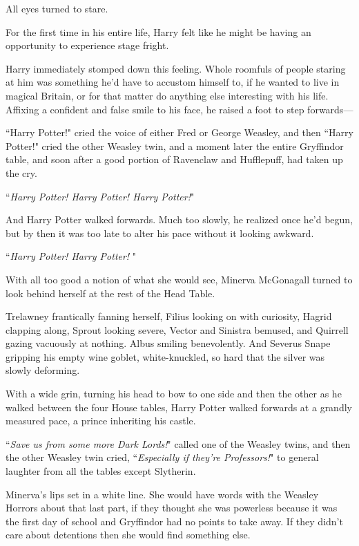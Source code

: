 All eyes turned to stare.

For the first time in his entire life, Harry felt like he might be having an opportunity to experience stage fright.

Harry immediately stomped down this feeling. Whole roomfuls of people staring at him was something he'd have to accustom himself to, if he wanted to live in magical Britain, or for that matter do anything else interesting with his life. Affixing a confident and false smile to his face, he raised a foot to step forwards—

``Harry Potter!" cried the voice of either Fred or George Weasley, and then ``Harry Potter!" cried the other Weasley twin, and a moment later the entire Gryffindor table, and soon after a good portion of Ravenclaw and Hufflepuff, had taken up the cry.

``\emph{Harry Potter! Harry Potter! Harry Potter!}"

And Harry Potter walked forwards. Much too slowly, he realized once he'd begun, but by then it was too late to alter his pace without it looking awkward.

\later

``\emph{Harry Potter! Harry Potter! }"

With all too good a notion of what she would see, Minerva McGonagall turned to look behind herself at the rest of the Head Table.

Trelawney frantically fanning herself, Filius looking on with curiosity, Hagrid clapping along, Sprout looking severe, Vector and Sinistra bemused, and Quirrell gazing vacuously at nothing. Albus smiling benevolently. And Severus Snape gripping his empty wine goblet, white-knuckled, so hard that the silver was slowly deforming.

With a wide grin, turning his head to bow to one side and then the other as he walked between the four House tables, Harry Potter walked forwards at a grandly measured pace, a prince inheriting his castle.

``\emph{Save us from some more Dark Lords!}" called one of the Weasley twins, and then the other Weasley twin cried, ``\emph{Especially if they're Professors!}" to general laughter from all the tables except Slytherin.

Minerva's lips set in a white line. She would have words with the Weasley Horrors about that last part, if they thought she was powerless because it was the first day of school and Gryffindor had no points to take away. If they didn't care about detentions then she would find something else.

